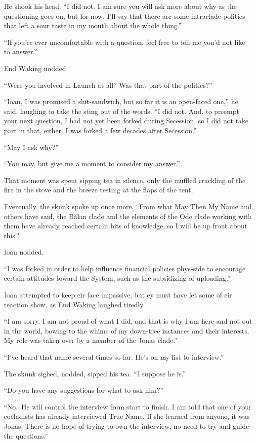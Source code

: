 He shook his head. ``I did not. I am sure you will ask more about why as the questioning goes on, but for now, I'll say that there are some intraclade politics that left a sour taste in my mouth about the whole thing.''

``If you're ever uncomfortable with a question, feel free to tell me you'd not like to answer.''

End Waking nodded.

``Were you involved in Launch at all? Was that part of the politics?''

``Ioan, I was promised a shit-sandwich, but so far it is an open-faced one,'' he said, laughing to take the sting out of the words. ``I did not. And, to preempt your next question, I had not yet been forked during Secession, so I did not take part in that, either. I was forked a few decades after Secession.''

``May I ask why?''

``You may, but give me a moment to consider my answer.''

That moment was spent sipping tea in silence, only the muffled crackling of the fire in the stove and the breeze testing at the flaps of the tent.

Eventually, the skunk spoke up once more. ``From what May Then My Name and others have said, the Bălan clade and the elements of the Ode clade working with them have already reached certain bits of knowledge, so I will be up front about this.''

Ioan nodded.

``I was forked in order to help influence financial policies phys-side to encourage certain attitudes toward the System, such as the subsidizing of uploading.''

Ioan attempted to keep eir face impassive, but ey must have let some of eir reaction show, as End Waking laughed tiredly.

``I am sorry. I am not proud of what I did, and that is why I am here and not out in the world, bowing to the whims of my down-tree instances and their interests. My role was taken over by a member of the Jonas clade.''

``I've heard that name several times so far. He's on my list to interview.''

The skunk sighed, nodded, sipped his tea. ``I suppose he is.''

``Do you have any suggestions for what to ask him?''

``No.~He will control the interview from start to finish. I am told that one of your cocladists has already interviewed True Name. If she learned from anyone, it was Jonas. There is no hope of trying to own the interview, no need to try and guide the questions.''

